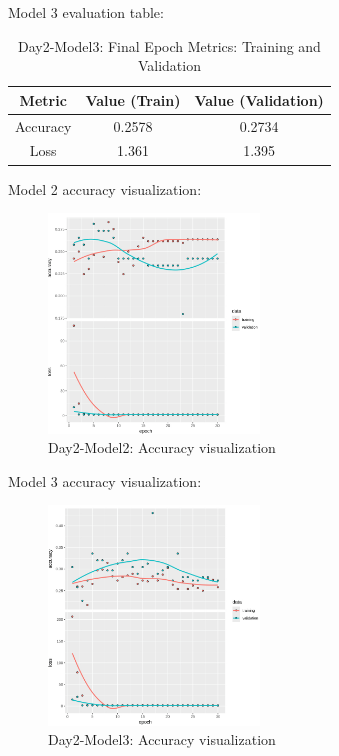 \documentclass[letterpaper,11pt]{article}
\begin{document}
Model 3 evaluation table:
\begin{table}[h!]
    \centering
    \begin{tabular}{|c|c|c|}
        \hline
        \textbf{Metric} & \textbf{Value (Train)} & \textbf{Value (Validation)} \\ \hline
        Accuracy & 0.2578 & 0.2734 \\ \hline
        Loss & 1.361 & 1.395 \\ \hline
    \end{tabular}
    \caption{Day2-Model3: Final Epoch Metrics: Training and Validation}
    \label{tab:D2M3_final_epoch}
\end{table}


Model 2 accuracy visualization:
\begin{figure}[H]
    \centering
    \includegraphics[width=0.5\textwidth]{Results/D2M2.jpg}
    \caption{Day2-Model2: Accuracy visualization}
    \label{fig:D1_m2}
\end{figure}
Model 3 accuracy visualization:
\begin{figure}[H]
    \centering
    \includegraphics[width=0.5\textwidth]{Results/D2M3.jpg}
    \caption{Day2-Model3: Accuracy visualization}
    \label{fig:D1_m3}
\end{figure}
\end{document}
